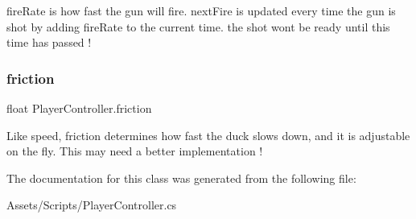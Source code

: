 fire\+Rate is how fast the gun will fire. next\+Fire is updated every time the gun is shot by adding fire\+Rate to the current time. the shot won\textquotesingle{}t be ready until this time has passed ! \mbox{\label{class_player_controller_a22510e0221512fb7fe06808912fa1a55}} 
\subsubsection{\texorpdfstring{friction}{friction}}
{\footnotesize\ttfamily float Player\+Controller.\+friction}

Like speed, friction determines how fast the duck slows down, and it is adjustable on the fly. This may need a better implementation ! 

The documentation for this class was generated from the following file\+:\begin{DoxyCompactItemize}
\item 
Assets/\+Scripts/Player\+Controller.\+cs\end{DoxyCompactItemize}
